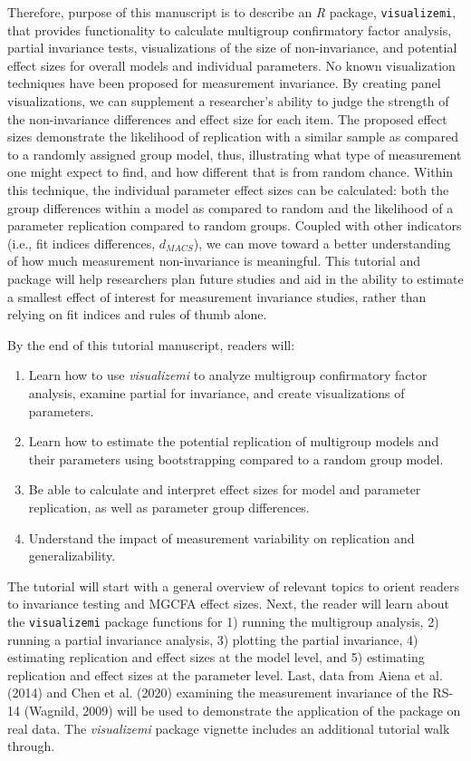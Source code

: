\documentclass[
  man]{apa7}
\providecommand{\tightlist}{%
  \setlength{\itemsep}{0pt}\setlength{\parskip}{0pt}}
\begin{document}
Therefore, purpose of this manuscript is to describe an \emph{R} package, \texttt{visualizemi}, that provides functionality to calculate multigroup confirmatory factor analysis, partial invariance tests, visualizations of the size of non-invariance, and potential effect sizes for overall models and individual parameters. No known visualization techniques have been proposed for measurement invariance. By creating panel visualizations, we can supplement a researcher's ability to judge the strength of the non-invariance differences and effect size for each item. The proposed effect sizes demonstrate the likelihood of replication with a similar sample as compared to a randomly assigned group model, thus, illustrating what type of measurement one might expect to find, and how different that is from random chance. Within this technique, the individual parameter effect sizes can be calculated: both the group differences within a model as compared to random and the likelihood of a parameter replication compared to random groups. Coupled with other indicators (i.e., fit indices differences, \(d_{MACS}\)), we can move toward a better understanding of how much measurement non-invariance is meaningful. This tutorial and package will help researchers plan future studies and aid in the ability to estimate a smallest effect of interest for measurement invariance studies, rather than relying on fit indices and rules of thumb alone.

By the end of this tutorial manuscript, readers will:

\begin{enumerate}
\def\labelenumi{\arabic{enumi}.}
\tightlist
\item
  Learn how to use \emph{visualizemi} to analyze multigroup confirmatory factor analysis, examine partial for invariance, and create visualizations of parameters.
\item
  Learn how to estimate the potential replication of multigroup models and their parameters using bootstrapping compared to a random group model.
\item
  Be able to calculate and interpret effect sizes for model and parameter replication, as well as parameter group differences.
\item
  Understand the impact of measurement variability on replication and generalizability.
\end{enumerate}

The tutorial will start with a general overview of relevant topics to orient readers to invariance testing and MGCFA effect sizes. Next, the reader will learn about the \texttt{visualizemi} package functions for 1) running the multigroup analysis, 2) running a partial invariance analysis, 3) plotting the partial invariance, 4) estimating replication and effect sizes at the model level, and 5) estimating replication and effect sizes at the parameter level. Last, data from Aiena et al. (2014) and Chen et al. (2020) examining the measurement invariance of the RS-14 (Wagnild, 2009) will be used to demonstrate the application of the package on real data. The \emph{visualizemi} package vignette includes an additional tutorial walk through.
\end{document}
